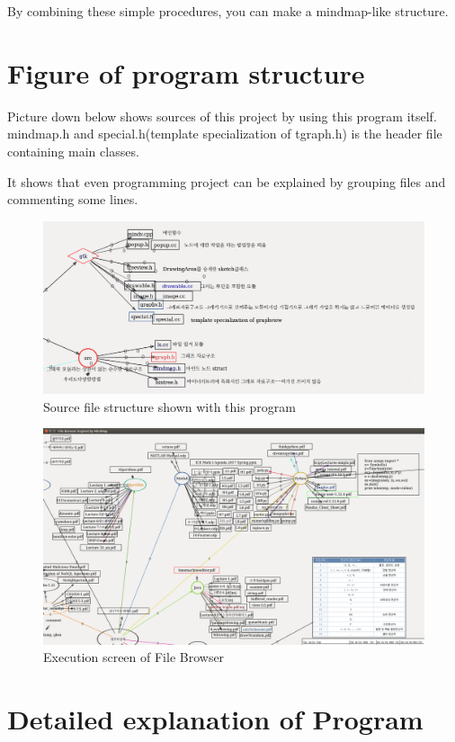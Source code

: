 \documentclass[12pt,a4paper]{report}
\begin{document}
By combining these simple procedures, you can make a mindmap-like structure.

\section{Figure of program structure}
Picture down below shows sources of this project by using this program itself.
mindmap.h and special.h(template specialization of tgraph.h) is the header file containing main classes.


It shows that even programming project can be explained by grouping files and commenting some lines.

\begin{figure}
	\includegraphics[width=\textwidth]{3.png}
	\caption{Source file structure shown with this program}
	\label{tree}
\end{figure}


\begin{figure}
	\includegraphics[width=\textwidth]{1.png}
	\caption{Execution screen of File Browser}
	\label{data}
\end{figure}

\newpage
\section{Detailed explanation of Program}
\end{document}
